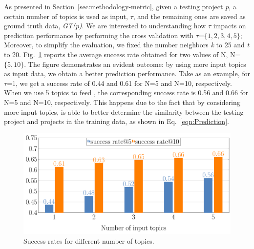 As presented in Section~\ref{sec:methodology-metric}, given a testing project \emph{p}, a certain number of topics is used as input, \ie $\tau$, and the remaining ones are saved as ground truth data, \ie \emph{GT(p)}. We are interested to understanding how $\tau$ impacts on prediction performance by performing the cross validation with $\tau$=$\{1,2,3,4,5\}$; Moreover, to simplify the evaluation, we fixed the number neighbors \emph{k} to 25 and \emph{t} to 20. Fig.~\ref{fig:pr-input-topics} reports the average success rate obtained for two values of N, \ie N=$\{5,10\}$. %
The figure demonstrates an evident outcome: by using more input topics as input data, we obtain a better prediction performance. Take as an example, for $\tau$=1, we get a success rate of 0.44 and 0.61 for N=5 and N=10, respectively. When we use 5 topics to feed \TFa, the corresponding success rate is 0.56 and 0.66 for N=5 and N=10, respectively. This happens due to the fact that by considering more input topics, \TFa is able to better determine the similarity between the testing project and projects in the training data, as shown in Eq.~\ref{eqn:Prediction}.

\begin{figure}[t!]
	\centering
	\includegraphics[width=0.8\linewidth]{figs/successRate_inputTopic.pdf}
	\caption{Success rates for different number of topics.}
	\label{fig:pr-input-topics}
\end{figure} 


